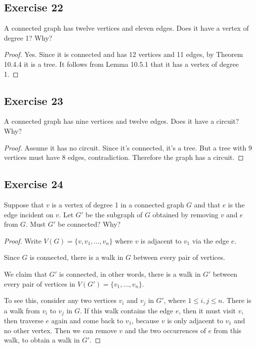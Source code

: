 \documentclass[14pt]{extarticle}
\begin{document}
\subsection{Exercise 22}
A connected graph has twelve vertices and eleven edges. Does it have a vertex of degree 1? Why?

\begin{proof}
Yes. Since it is connected and has 12 vertices and 11 edges, by Theorem 10.4.4 it is a tree. It follows from Lemma 10.5.1 
that it has a vertex of degree 1.
\end{proof}

\subsection{Exercise 23}
A connected graph has nine vertices and twelve edges. Does it have a circuit? Why?

\begin{proof}
Assume it has no circuit. Since it's connected, it's a tree. But a tree with 9 vertices must have 8 edges, contradiction.
Therefore the graph has a circuit.
\end{proof}

\subsection{Exercise 24}
Suppose that \(v\) is a vertex of degree 1 in a connected graph \(G\) and that \(e\) is the edge incident on \(v\). Let 
\(G'\) be the subgraph of \(G\) obtained by removing \(v\) and \(e\) from \(G\). Must \(G'\) be connected? Why?

\begin{proof}
Write \(V(G) = \{v, v_1, \ldots, v_n\}\) where \(v\) is adjacent to \(v_1\) via the edge \(e\).

Since \(G\) is connected, there is a walk in \(G\) between every pair of vertices.

We claim that \(G'\) is connected, in other words, there is a walk in \(G'\) between every pair of vertices in \(V(G') = 
\{v_1, \ldots, v_n\}\). 

To see this, consider any two vertices \(v_i\) and \(v_j\) in \(G'\), where \(1 \leq i, j \leq n\). There is a walk from \(v_i\) to \(v_j\) in \(G\). If this walk contains the edge \(e\), then it must visit \(v\), then traverse \(e\) again and
come back to \(v_1\), because \(v\) is only adjacent to \(v_1\) and no other vertex. Then we can remove \(v\) and the 
two occurrences of \(e\) from this walk, to obtain a walk in \(G'\).
\end{proof}
\end{document}
